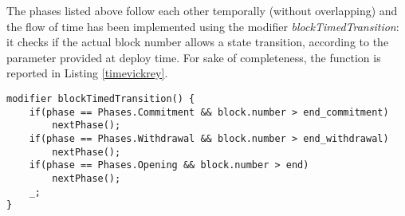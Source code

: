 \documentclass{article}
\begin{document}
The phases listed above follow each other temporally (without overlapping) and the flow of time has been implemented using the modifier \textit{blockTimedTransition}: it checks if the actual block number allows a state transition, according to the parameter provided at deploy time. For sake of completeness, the function is reported in Listing \ref{timevickrey}.

\begin{lstlisting}[language=Solidity, caption={Modifier used for modelling the time flow during a Vickrey auction. The function \textit{nextPhase()} realise the transition from the actual phase to the next one, following the order described above and emitting an event.},captionpos=b, label=timevickrey]
modifier blockTimedTransition() {
    if(phase == Phases.Commitment && block.number > end_commitment)
        nextPhase();
    if(phase == Phases.Withdrawal && block.number > end_withdrawal)
        nextPhase();
    if(phase == Phases.Opening && block.number > end)
        nextPhase();
    _;
}
\end{lstlisting}
\end{document}
